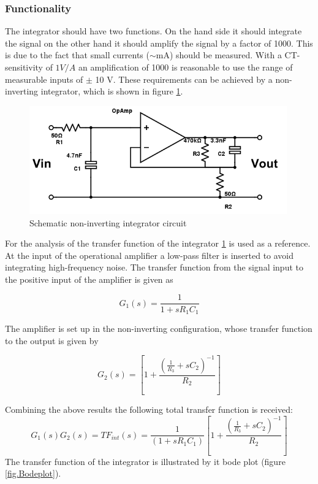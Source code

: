\subsubsection{Functionality}
The integrator should have two functions. On the hand side it should integrate the signal on the other hand it should amplify the signal by a factor of 1000. This is due to the fact that small currents ($\sim$mA) should be measured. With a CT-sensitivity of $1V/A$ an amplification of 1000 is reasonable to use the range of measurable inputs of $\pm$ 10 V. \footnotemark These requirements can be achieved by a non-inverting integrator, which is shown in figure  \ref{fig.circuit}. 
\begin{figure}[h!tb]
\includegraphics[width=0.99\textwidth]{figures/Method/integrator/circuit.png}
    \caption{Schematic non-inverting integrator circuit}
    \label{fig.circuit}
\end{figure}	

For the analysis of the transfer function of the integrator \ref{fig.circuit} is used as a reference.
At the input of the operational amplifier a low-pass filter is inserted to avoid integrating high-frequency noise.
The transfer function from the signal input to the positive input of the amplifier is given as

\begin{equation}
  G_1(s)=\frac{1}{1+sR_1C_1}
\end{equation}

The amplifier is set up in the non-inverting configuration, whose transfer function to the output is given by

\begin{equation}
 G_2(s)=\left[1+\frac{\left(\frac{1}{R_3}+sC_2\right)^{-1}}{R_2}\right]
\end{equation}

Combining the above results the following total transfer function is received:
\begin{equation}
	G_1(s)G_2(s)=TF_{int}(s)=\frac{1}{(1+s R_1 C_1)}\left[1+\frac{\left(\frac{1}{R_3}+sC_2\right)^{-1}}{R_2}\right]
\end{equation}
The transfer function of the integrator is illustrated by it bode plot (figure \ref{fig.Bodeplot}). 

